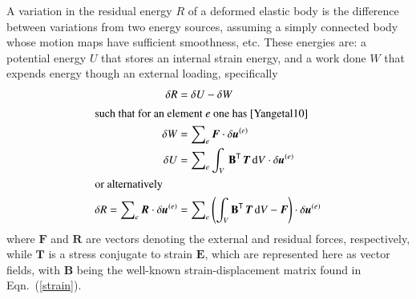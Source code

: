 A variation in the residual energy $R$ of a deformed elastic body is the difference between variations from two energy sources, assuming a simply connected body whose motion maps have sufficient smoothness, etc.  These energies are: a potential energy $U$ that stores an internal strain energy, and a work done $W$ that expends energy though an external loading, specifically
\begin{subequations}
    \label{principle}
    \begin{align}
    \delta{R} &= \delta{U} - \delta{W} \\
    \intertext{such that for an element $e$ one has \cite{Yangetal10}}
    \delta{W} & = \sum\nolimits_e \boldsymbol{F} \cdot \delta\boldsymbol{u}^{(e)} \\
    \delta{U} & = \sum\nolimits_e \int_{V} \, \mathbf{B}^{\mathsf{T}} \,
    \boldsymbol{T} \, \mathrm{d} V \cdot \delta\boldsymbol{u}^{(e)} \\
    \intertext{or alternatively}
    \delta R = \sum\nolimits_e \boldsymbol{R} \cdot \delta \boldsymbol{u}^{(e)} & = 
    \sum\nolimits_e \left( \int_V \mathbf{B}^{\mathsf{T}} \, \boldsymbol{T} \, \mathrm{d}V - 
    \boldsymbol{F} \right) \cdot \delta \boldsymbol{u}^{(e)} 
    \label{residualVariation}
    \end{align}
\end{subequations}
where $\boldsymbol{F}$ and $\boldsymbol{R}$ are vectors denoting the external and residual forces, respectively, while $\boldsymbol{T}$ is a stress conjugate to strain $\boldsymbol{E}$, which are represented here as vector fields, with $\mathbf{B}$ being the well-known strain-displacement matrix found in Eqn.~(\ref{strain}).

